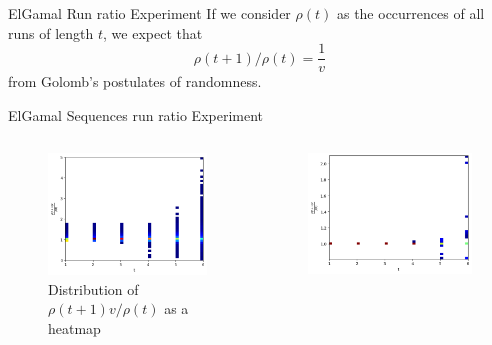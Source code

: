 
\begin{frame}{ElGamal Run ratio Experiment}
    If we consider $\rho(t)$ as the occurrences of all runs of length $t$, we expect that 
    $$ \rho(t+1)/\rho(t) = \frac{1}{v} $$
    from Golomb's postulates of randomness.
\end{frame}

\begin{frame}{ElGamal Sequences run ratio Experiment}
    \begin{columns}
        \begin{column}{0.45\textwidth}
            \begin{figure}
                \centering
                \includegraphics[width=\textwidth]{figures/AllDataNormalizedrunratio.png}
                \caption{Distribution of $\rho(t+1)v/\rho(t)$ as a heatmap}
            \end{figure}
        \end{column}
        \begin{column}{0.45\textwidth}
            \begin{figure}
                \centering
                \includegraphics[width=\textwidth]{figures/AllDataAndvisGenNormalizedrunratio.png}

\end{figure}
\end{column}
\end{columns}
\end{frame}
